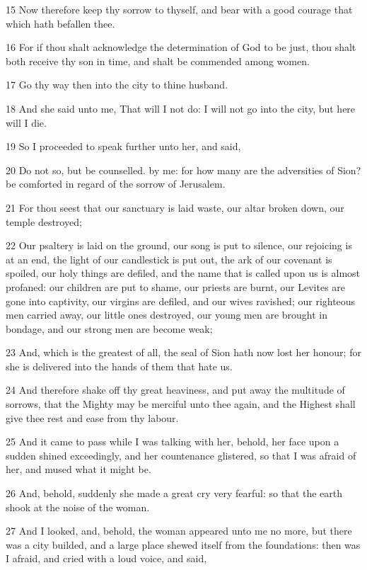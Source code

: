 \par 15 Now therefore keep thy sorrow to thyself, and bear with a good courage that which hath befallen thee.
\par 16 For if thou shalt acknowledge the determination of God to be just, thou shalt both receive thy son in time, and shalt be commended among women.
\par 17 Go thy way then into the city to thine husband.
\par 18 And she said unto me, That will I not do: I will not go into the city, but here will I die.
\par 19 So I proceeded to speak further unto her, and said,
\par 20 Do not so, but be counselled. by me: for how many are the adversities of Sion? be comforted in regard of the sorrow of Jerusalem.
\par 21 For thou seest that our sanctuary is laid waste, our altar broken down, our temple destroyed;
\par 22 Our psaltery is laid on the ground, our song is put to silence, our rejoicing is at an end, the light of our candlestick is put out, the ark of our covenant is spoiled, our holy things are defiled, and the name that is called upon us is almost profaned: our children are put to shame, our priests are burnt, our Levites are gone into captivity, our virgins are defiled, and our wives ravished; our righteous men carried away, our little ones destroyed, our young men are brought in bondage, and our strong men are become weak;
\par 23 And, which is the greatest of all, the seal of Sion hath now lost her honour; for she is delivered into the hands of them that hate us.
\par 24 And therefore shake off thy great heaviness, and put away the multitude of sorrows, that the Mighty may be merciful unto thee again, and the Highest shall give thee rest and ease from thy labour.
\par 25 And it came to pass while I was talking with her, behold, her face upon a sudden shined exceedingly, and her countenance glistered, so that I was afraid of her, and mused what it might be.
\par 26 And, behold, suddenly she made a great cry very fearful: so that the earth shook at the noise of the woman.
\par 27 And I looked, and, behold, the woman appeared unto me no more, but there was a city builded, and a large place shewed itself from the foundations: then was I afraid, and cried with a loud voice, and said,
